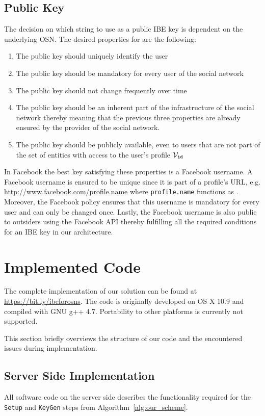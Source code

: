 \subsection{Public Key}
The decision on which string to use as a public IBE key \id{} is dependent on the underlying OSN. The desired properties for \id{} are the following:
\begin{enumerate}
 \item The public key should uniquely identify the user
 \item The public key should be mandatory for every user of the social network
 \item The public key should not change frequently over time
 \item The public key should be an inherent part of the infrastructure of the social network thereby meaning that the previous three properties are already ensured by the provider of the social network.
 \item The public key should be publicly available, even to users that are not part of the set of entities with access to the user's profile $\mathcal{V}_{\mathtt{id}_{}}$
\end{enumerate}
In Facebook the best key satisfying these properties is a Facebook username. A Facebook username is ensured to be unique since it is part of a profile's URL, e.g. \url{http://www.facebook.com/profile.name} where \texttt{profile.name} functions as \id{}. Moreover, the Facebook policy ensures that this username is mandatory for every user and can only be changed once. Lastly, the Facebook username is also public to outsiders using the Facebook API thereby fulfilling all the required conditions for an IBE key in our architecture.

\section{Implemented Code}
\label{sec:implemented_code}
The complete implementation of our solution can be found at \url{https://bit.ly/ibeforosns}. The code is originally developed on OS X 10.9 and compiled with GNU g++ 4.7. Portability to other platforms is currently not supported. 

This section briefly overviews the structure of our code and the encountered issues during implementation.


\subsection{Server Side Implementation}
All software code on the server side describes the functionality required for the \texttt{Setup} and \texttt{KeyGen} steps from Algorithm~\ref{alg:our_scheme}.

